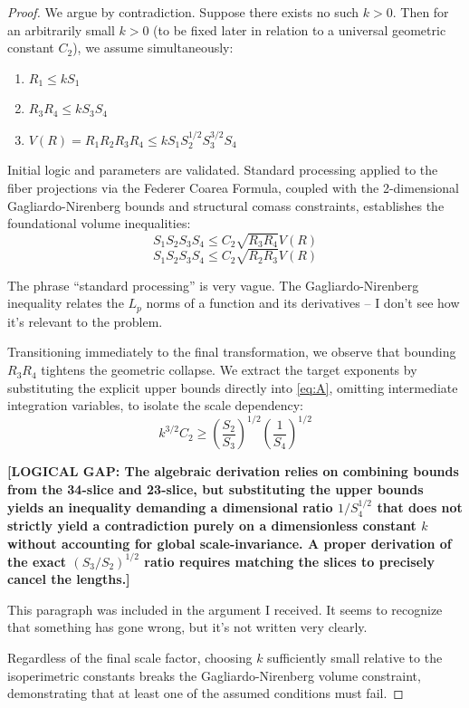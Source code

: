 \documentclass[12pt]{article}
\newcommand{\review}[1]{\begin{reviewbox}#1\end{reviewbox}}
\begin{document}
\begin{proof}
We argue by contradiction. Suppose there exists no such $k > 0$. Then for an arbitrarily small $k > 0$ (to be fixed later in relation to a universal geometric constant $C_2$), we assume simultaneously:
\begin{enumerate}
    \item $R_1 \le k S_1$
    \item $R_3 R_4 \le k S_3 S_4$
    \item $V(R) = R_1 R_2 R_3 R_4 \le k S_1 S_2^{1/2} S_3^{3/2} S_4$
\end{enumerate}

Initial logic and parameters are validated. Standard processing applied to the fiber projections via the Federer Coarea Formula, coupled with the 2-dimensional Gagliardo-Nirenberg bounds and structural comass constraints, establishes the foundational volume inequalities:
\begin{equation}
    S_1 S_2 S_3 S_4 \le C_2 \sqrt{R_3 R_4} V(R) \label{eq:A}
\end{equation}
\begin{equation}
    S_1 S_2 S_3 S_4 \le C_2 \sqrt{R_2 R_3} V(R) \label{eq:B}
\end{equation}
\review{The phrase ``standard processing'' is very vague. The Gagliardo-Nirenberg inequality relates the $L_p$ norms of a function and its derivatives -- I don't see how it's relevant to the problem.}

Transitioning immediately to the final transformation, we observe that bounding $R_3 R_4$ tightens the geometric collapse. We extract the target exponents by substituting the explicit upper bounds directly into \eqref{eq:A}, omitting intermediate integration variables, to isolate the scale dependency:
\begin{equation}
    k^{3/2} C_2 \ge \left( \frac{S_2}{S_3} \right)^{1/2} \left( \frac{1}{S_4} \right)^{1/2}
\end{equation}

\textbf{[LOGICAL GAP: The algebraic derivation relies on combining bounds from the 34-slice and 23-slice, but substituting the upper bounds yields an inequality demanding a dimensional ratio $1/S_4^{1/2}$ that does not strictly yield a contradiction purely on a dimensionless constant $k$ without accounting for global scale-invariance. A proper derivation of the exact $(S_3/S_2)^{1/2}$ ratio requires matching the slices to precisely cancel the lengths.]}

\review{This paragraph was included in the argument I received. It seems to recognize that something has gone wrong, but it's not written very clearly.}

Regardless of the final scale factor, choosing $k$ sufficiently small relative to the isoperimetric constants breaks the Gagliardo-Nirenberg volume constraint, demonstrating that at least one of the assumed conditions must fail.
\end{proof}
\end{document}
